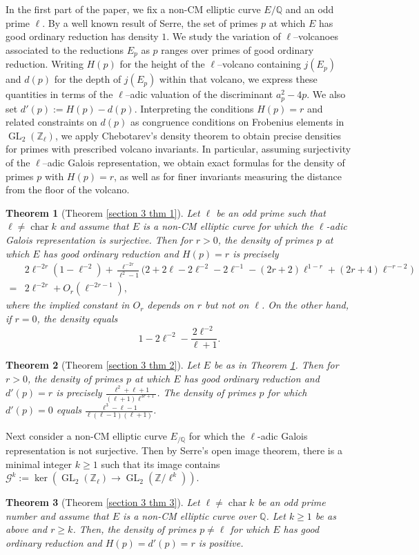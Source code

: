 \documentclass[table]{amsart}
\newtheorem{lthm}{Theorem}
\newcommand{\Z}{\mathbb{Z}}
\newcommand{\Q}{\mathbb{Q}}
\newcommand{\op}[1]{\operatorname{#1}}
\numberwithin{equation}{section}
\begin{document}
In the first part of the paper, we fix a non-CM elliptic curve $E/\Q$ and an odd prime $\ell$. By a well known result of Serre, the set of primes $p$ at which $E$ has good ordinary reduction has density $1$. We study the variation of $\ell$–volcanoes associated to the reductions $E_p$ as $p$ ranges over primes of good ordinary reduction. Writing $H(p)$ for the height of the $\ell$–volcano containing $j(E_p)$ and $d(p)$ for the depth of $j(E_p)$ within that volcano, we express these quantities in terms of the $\ell$–adic valuation of the discriminant $a_p^2-4p$. We also set $d'(p):=H(p)-d(p)$. Interpreting the conditions $H(p)=r$ and related constraints on $d(p)$ as congruence conditions on Frobenius elements in $\op{GL}_2(\Z_\ell)$, we apply Chebotarev’s density theorem to obtain precise densities for primes with prescribed volcano invariants. In particular, assuming surjectivity of the $\ell$–adic Galois representation, we obtain exact formulas for the density of primes $p$ with $H(p)=r$, as well as for finer invariants measuring the distance from the floor of the volcano.

\begin{lthm}[Theorem \ref{section 3 thm 1}]\label{thma}
     Let $\ell$ be an odd prime such that $\ell\neq \op{char}k$ and assume that $E$ is a non-CM elliptic curve for which the $\ell$-adic Galois representation is surjective. Then for $r>0$, the density of primes $p$ at which $E$ has good ordinary reduction and $H(p)=r$ is precisely 
  \[\begin{split}&2\ell^{-2r}(1-\ell^{-2})
+
\frac{\ell^{-2r}}{\ell^{2}-1}
\Big(
2+2\ell-2\ell^{-2}-2\ell^{-1}
-(2r+2)\ell^{1-r}
+(2r+4)\ell^{-r-2}
\Big)\\
=& 2\ell^{-2r}+O_r(\ell^{-2r-1}),\end{split}\]where the implied constant in $O_r$ depends on $r$ but not on $\ell$. On the other hand, if $r=0$, the density equals 
\[
1-2\ell^{-2}-\frac{2\ell^{-2}}{\ell+1}.
\]
\end{lthm}

\begin{lthm}[Theorem \ref{section 3 thm 2}]
    Let $E$ be as in Theorem \ref{thma}. Then for $r>0$, the density of primes $p$ at which $E$ has good ordinary reduction and $d'(p)=r$ is precisely $\frac{\ell^2+\ell+1}{(\ell+1)\ell^{3r+1}}$. The density of primes $p$ for which $d'(p)=0$ equals $\frac{\ell^3-\ell-1}{\ell(\ell-1)(\ell+1)}$.
\end{lthm}

Next consider a non-CM elliptic curve $E_{/\Q}$ for which the $\ell$-adic Galois representation is not surjective. Then by Serre's open image theorem, there is a minimal integer $k\geq 1$ such that its image contains $\mathcal{G}^k:=\op{ker}\left(\op{GL}_2(\Z_\ell)\longrightarrow \op{GL}_2(\Z/\ell^k)\right)$. 
\begin{lthm}[Theorem \ref{section 3 thm 3}]
    Let $\ell\neq \op{char}k$ be an odd prime number and assume that $E$ is a non-CM elliptic curve over $\Q$. Let $k\geq 1$ be as above and $r\geq k$. Then, the density of primes $p\neq \ell$ for which $E$ has good ordinary reduction and $H(p)=d'(p)=r$ is positive. 
\end{lthm}
\end{document}
